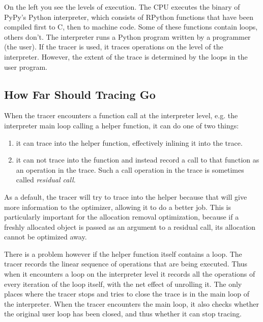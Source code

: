 \documentclass{sig-alternate}
\begin{document}
On the left you see the levels of execution. The CPU executes the binary of
PyPy's Python interpreter, which consists of RPython functions that have been
compiled first to C, then to machine code. Some of these functions contain
loops, others don't. The interpreter runs a Python program written by a
programmer (the user). If the tracer is used, it traces operations on the level
of the interpreter. However, the extent of the trace is determined by the loops
in the user program.



\subsection{How Far Should Tracing Go}

When the tracer encounters a function call at the interpreter level, e.g. the
interpreter main loop calling a helper function, it can do one of two things:

\begin{enumerate}
\item it can trace into the helper function, effectively inlining it into the trace.

\item it can not trace into the function and instead record a call to that function
as an operation in the trace. Such a call operation in the trace is sometimes
called \emph{residual call}.
\end{enumerate}

As a default, the tracer will try to trace into the helper because that will
give more information to the optimizer, allowing it to do a better job. This is
particularly important for the allocation removal optimization, because if a
freshly allocated object is passed as an argument to a residual call, its
allocation cannot be optimized away.

There is a problem however if the helper function itself contains a loop. The
tracer records the linear sequence of operations that are being executed. Thus
when it encounters a loop on the interpreter level it records all the
operations of every iteration of the loop itself, with the net effect of
unrolling it. The only places where the tracer stops and tries to close the
trace is in the main loop of the interpreter. When the tracer encounters the
main loop, it also checks whether the original user loop has been closed, and
thus whether it can stop tracing.
\end{document}
